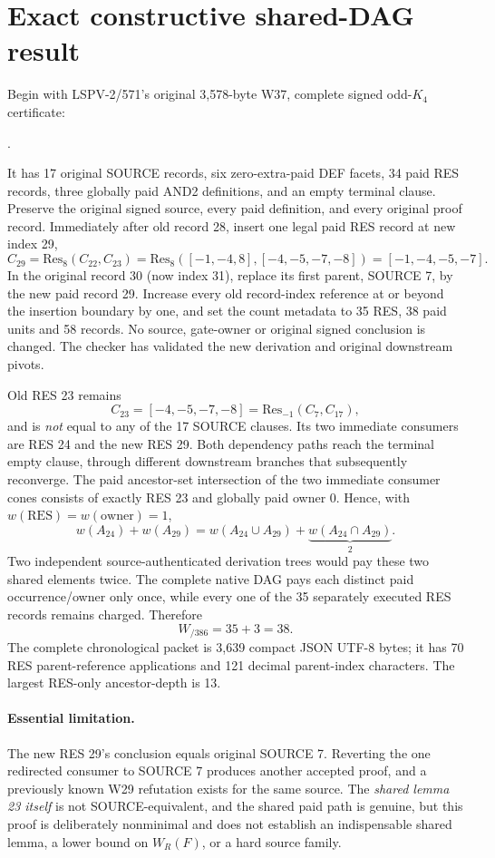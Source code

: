 \documentclass[11pt]{article}
\begin{document}
\section*{Exact constructive shared-DAG result}
Begin with LSPV-2/571's original 3,578-byte W37, complete signed odd-$K_4$ certificate:
\begin{center}
.
\end{center}
It has 17 original SOURCE records, six zero-extra-paid DEF facets, 34 paid RES records, three globally paid AND2 definitions, and an empty terminal clause. Preserve the original signed source, every paid definition, and every original proof record. Immediately after old record 28, insert one legal paid RES record at new index 29,
\[
C_{29}=\mathrm{Res}_{8}(C_{22},C_{23})
=\mathrm{Res}_{8}([-1,-4,8],[-4,-5,-7,-8])
=[-1,-4,-5,-7].
\]
In the original record 30 (now index 31), replace its first parent, SOURCE 7, by the new paid record 29. Increase every old record-index reference at or beyond the insertion boundary by one, and set the count metadata to 35 RES, 38 paid units and 58 records. No source, gate-owner or original signed conclusion is changed. The checker has validated the new derivation and original downstream pivots.

Old RES 23 remains
\[
C_{23}=[-4,-5,-7,-8]
=\mathrm{Res}_{-1}(C_7,C_{17}),
\]
and is \emph{not} equal to any of the 17 SOURCE clauses. Its two immediate consumers are RES 24 and the new RES 29. Both dependency paths reach the terminal empty clause, through different downstream branches that subsequently reconverge. The paid ancestor-set intersection of the two immediate consumer cones consists of exactly RES 23 and globally paid owner 0. Hence, with $w(\mathrm{RES})=w(\mathrm{owner})=1$,
\[
w(A_{24})+w(A_{29})=
w(A_{24}\cup A_{29})+\underbrace{w(A_{24}\cap A_{29})}_{2}.
\]
Two independent source-authenticated derivation trees would pay these two shared elements twice. The complete native DAG pays each distinct paid occurrence/owner only once, while every one of the 35 separately executed RES records remains charged. Therefore
\[
\boxed{W_{\mathrm{/386}}=35+3=38.}
\]
The complete chronological packet is 3,639 compact JSON UTF-8 bytes; it has 70 RES parent-reference applications and 121 decimal parent-index characters. The largest RES-only ancestor-depth is 13.

\paragraph{Essential limitation.}
The new RES 29's conclusion equals original SOURCE 7. Reverting the one redirected consumer to SOURCE 7 produces another accepted proof, and a previously known W29 refutation exists for the same source. The \emph{shared lemma 23 itself} is not SOURCE-equivalent, and the shared paid path is genuine, but this proof is deliberately nonminimal and does not establish an indispensable shared lemma, a lower bound on $W_R(F)$, or a hard source family.
\end{document}
